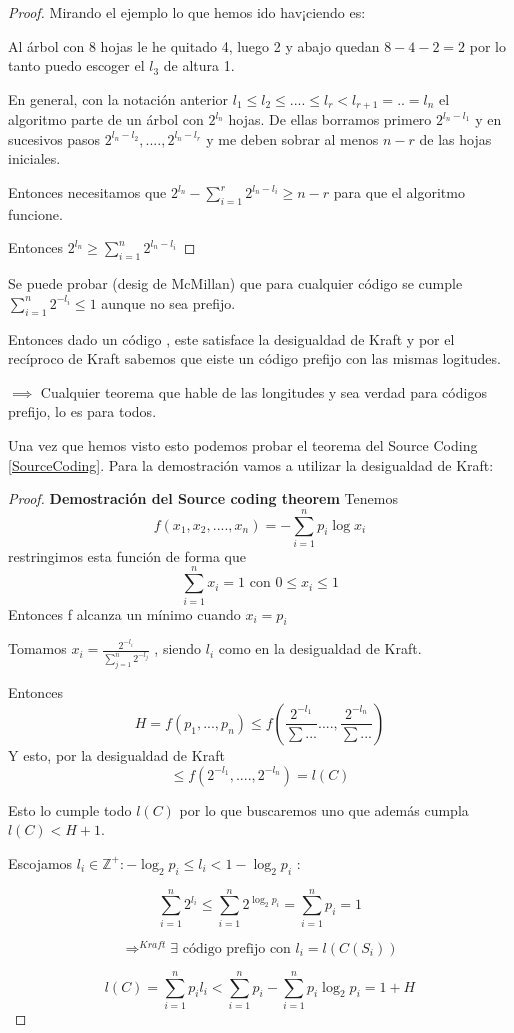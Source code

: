 \begin{proof}
	Mirando el ejemplo lo que hemos ido hav¡ciendo es:

	Al árbol con 8 hojas le he quitado 4, luego 2 y abajo quedan $8-4-2 = 2$ por lo tanto puedo escoger el $l_3$ de altura 1.

	En general, con la notación anterior $l_1 \leq l_2 \leq .... \leq l_{r} < l_{r+1} = .. = l_n$ el algoritmo parte de un árbol con $2^{l_n}$ hojas. De ellas borramos primero $2^{l_n - l_1}$ y en sucesivos pasos $2^{l_n - l_2} , .... , 2^{l_n - l_r}$ y me deben sobrar al menos $n-r$ de las hojas iniciales.

	Entonces necesitamos que $2^{l_n} - \sum_{i=1}^{r} 2^{l_n - l_i} \geq n-r$ para que el algoritmo funcione.

	Entonces $2^{l_n} \geq \sum_{i=1}^{n} 2^{l_n - l_i}$
\end{proof}

\obs Se puede probar (desig de McMillan) que para cualquier código se cumple $\sum_{i=1}^{n} 2^{-l_i} \leq 1$ aunque no sea prefijo.

Entonces dado un código , este satisface la desigualdad de Kraft y por el recíproco de Kraft sabemos que eiste un código prefijo con las mismas logitudes.

$\implies$ Cualquier teorema que hable de las longitudes y sea verdad para códigos prefijo, lo es para todos.


Una vez que hemos visto esto podemos probar el teorema del Source Coding \ref{SourceCoding}. Para la demostración vamos a utilizar la desigualdad de Kraft:

\begin{proof}
	\textbf{Demostración del Source coding theorem}
	Tenemos
	$$f(x_1 , x_2 , ...., x_n) = -\sum_{i=1}^{n} p_i \log x_i$$
	restringimos esta función de forma que
	$$\sum_{i=1}^{n} x_i = 1 \text{   con   } 0 \leq x_i \leq 1$$
	Entonces f alcanza un mínimo cuando $x_i = p_i$

	Tomamos $x_i = \frac{2^{-l_i}}{\sum_{j=1}^{n} 2^{-l_j}}$ , siendo $l_i$ como en la desigualdad de Kraft.

		Entonces
		$$H= f(p_1,...,p_n) \leq f (\frac{2^{-l_1}}{\sum ...} .... , \frac{2^{-l_n}}{\sum ...})$$
		Y esto, por la desigualdad de Kraft
		$$\leq f(2^{-l_1} , .... , 2^{-l_n}) = l(C)$$

	Esto lo cumple todo $l(C)$ por lo que buscaremos uno que además cumpla $l(C) < H+1$.

	Escojamos $l_i \in \mathbb{Z}^+ : -\log_2 p_i \leq l_i < 1 - \log_2 p_i$ :

	$$\sum^{n}_{i = 1} 2^{l_i} \leq \sum^{n}_{i = 1} 2^{\log_2 p_i} = \sum^{n}_{i = 1} p_i = 1 $$

	$$\Rightarrow^{Kraft} \exists \text{ código prefijo con } l_i = l(C(S_i))$$

	$$l(C) = \sum^{n}_{i = 1} p_i l_i < \sum^{n}_{i = 1} p_i - \sum^{n}_{i = 1} p_i \log_{2} p_i = 1 + H$$

\end{proof}

